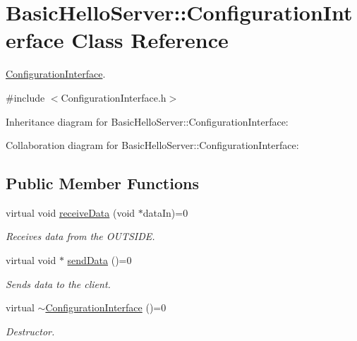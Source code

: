\hypertarget{classBasicHelloServer_1_1ConfigurationInterface}{}\section{Basic\+Hello\+Server\+::Configuration\+Interface Class Reference}
\label{classBasicHelloServer_1_1ConfigurationInterface}


\mbox{\hyperlink{classBasicHelloServer_1_1ConfigurationInterface}{Configuration\+Interface}}.  




{\ttfamily \#include $<$Configuration\+Interface.\+h$>$}



Inheritance diagram for Basic\+Hello\+Server\+::Configuration\+Interface\+:


Collaboration diagram for Basic\+Hello\+Server\+::Configuration\+Interface\+:
\subsection*{Public Member Functions}
\begin{DoxyCompactItemize}
\item 
\mbox{\label{classBasicHelloServer_1_1ConfigurationInterface_ac78a0a5d2a619073b272ca216ff14f14}} 
virtual void \mbox{\hyperlink{classBasicHelloServer_1_1ConfigurationInterface_ac78a0a5d2a619073b272ca216ff14f14}{receive\+Data}} (void $\ast$data\+In)=0
\begin{DoxyCompactList}\small\item\em Receives data from the O\+U\+T\+S\+I\+DE. \end{DoxyCompactList}\item 
\mbox{\label{classBasicHelloServer_1_1ConfigurationInterface_aafa11e6b4a4aac078138be7ff7e5ad9c}} 
virtual void $\ast$ \mbox{\hyperlink{classBasicHelloServer_1_1ConfigurationInterface_aafa11e6b4a4aac078138be7ff7e5ad9c}{send\+Data}} ()=0
\begin{DoxyCompactList}\small\item\em Sends data to the client. \end{DoxyCompactList}\item 
virtual \mbox{\hyperlink{classBasicHelloServer_1_1ConfigurationInterface_a7d175c98ee86cab421e3eefe8a84a826}{$\sim$\+Configuration\+Interface}} ()=0
\begin{DoxyCompactList}\small\item\em Destructor. \end{DoxyCompactList}\end{DoxyCompactItemize}


